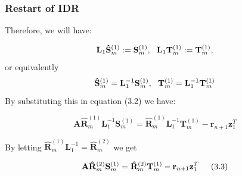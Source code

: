 \documentclass[mathserif]{beamer}
\begin{document}
\begin{frame}
\frametitle{Restart of IDR}
Therefore, we will have:

\[\mathbf{L}_1 \mathbf{\hat S}_m^{(1)}:=\mathbf{S}_m^{(1)}, \hspace{.09in} \mathbf{L}_1 \mathbf{T}_m^{(1)}:=\mathbf{T}_m^{(1)},\] \pause or equivalently \[\mathbf{\hat S}_m^{(1)}=\mathbf{L}_1^{-1}\mathbf{S}_m^{(1)}, \hspace{.09in} \mathbf{T}_m^{(1)}=\mathbf{L}_1^{-1}\mathbf{T}_m^{(1)} \]
\pause By substituting this in equation (3.2) we have: 

\[\mathbf{A} \mathbf{\hat R}_m^{(1)}\mathbf{L}_1^{-1}\mathbf{S}_m^{(1)}=\mathbf{\hat R}_m^{(1)}\mathbf{L}_1^{-1}\mathbf{T}_m^{(1)}-\mathbf{r}_{n+1}\mathbf{z}_1^T\]

By letting $\mathbf{\hat R}_m^{(1)}\mathbf{L}_1^{-1}=\mathbf{\hat R}_m^{(2)}$ we get 

\[\mathbf{A} \mathbf{\hat R}_m^{(2)}\mathbf{S}_m^{(1)}=\mathbf{\hat R}_m^{(2)}\mathbf{T}_m^{(1)} - \mathbf{r}_{n+1} \mathbf{z}_1^T \hspace{.2in}(3.3)\]
\end{frame}
\end{document}
